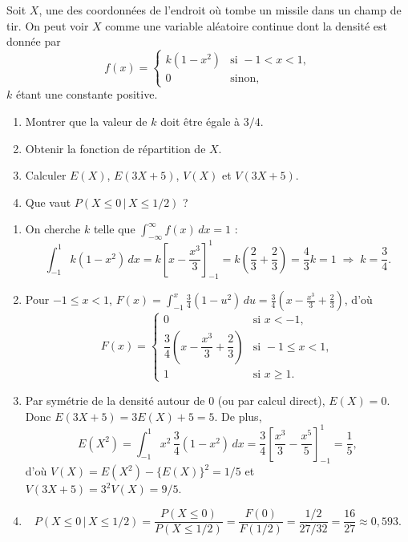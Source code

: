 \begin{exercice}
Soit $X$, une des coordonnées de l'endroit où tombe un missile dans un champ de tir. On peut
voir $X$ comme une variable aléatoire continue dont la densité est donnée par
\[
  f(x)=\begin{cases} k(1-x^2) & \text{si } -1<x<1,\\ 0 & \text{sinon},\end{cases}
\]
$k$ étant une constante positive.
\begin{enumerate}[label=(\alph*)]
  \item Montrer que la valeur de $k$ doit être égale à $3/4$.
  \item Obtenir la fonction de répartition de $X$.
  \item Calculer $E(X)$, $E(3X+5)$, $V(X)$ et $V(3X+5)$.
  \item Que vaut $P(X\le 0\,|\,X\le 1/2)$ ?
\end{enumerate}
\begin{solution}
\begin{enumerate}[label=(\alph*)]
  \item On cherche $k$ telle que $\int_{-\infty}^{\infty}f(x)\,dx=1$ :
  \[
    \int_{-1}^{1}k(1-x^2)\,dx=k\left[x-\frac{x^3}{3}\right]_{-1}^{1}
    =k\left(\frac{2}{3}+\frac{2}{3}\right)=\frac{4}{3}k=1
    \;\Longrightarrow\;k=\frac{3}{4}.
  \]
  \item Pour $-1\le x<1$,
  $F(x)=\int_{-1}^{x}\frac34(1-u^2)\,du=\frac34\left(x-\frac{x^3}{3}+\frac23\right)$, d'où
  \[
    F(x)=\begin{cases}
      0 & \text{si } x<-1,\\[2pt]
      \dfrac34\left(x-\dfrac{x^3}{3}+\dfrac23\right) & \text{si } -1\le x<1,\\[6pt]
      1 & \text{si } x\ge 1.
    \end{cases}
  \]
  \item Par symétrie de la densité autour de 0 (ou par calcul direct), $E(X)=0$.
  Donc $E(3X+5)=3E(X)+5=5$. De plus,
  \[
    E(X^2)=\int_{-1}^{1}x^2\,\frac34(1-x^2)\,dx
    =\frac34\left[\frac{x^3}{3}-\frac{x^5}{5}\right]_{-1}^{1}=\frac15,
  \]
  d'où $V(X)=E(X^2)-\{E(X)\}^2=1/5$ et $V(3X+5)=3^2V(X)=9/5$.
  \item
  \[
    P(X\le 0\,|\,X\le 1/2)=\frac{P(X\le 0)}{P(X\le 1/2)}=\frac{F(0)}{F(1/2)}
    =\frac{1/2}{27/32}=\frac{16}{27}\approx 0,593.
  \]
\end{enumerate}
\end{solution}
\end{exercice}

